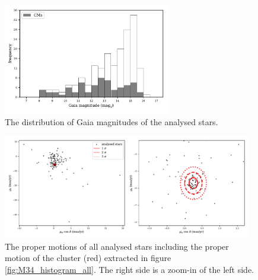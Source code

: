 \documentclass{article}
\begin{document}
\begin{figure}[H]
  \centering
    \includegraphics[trim={0 0.4cm 0 0.2cm},clip,width=0.65\textwidth]{M34_histogram_mags.pdf}
  \caption{The distribution of Gaia magnitudes of the analysed stars.}
  \label{fig:M34_histogram_mags}
\end{figure}

\begin{figure}[H]
  \centering
    \includegraphics[trim={0 0.5cm 0 0.5cm},clip,width=0.97\textwidth]{M34_pm_scatter_sigma.pdf}
  \caption{The proper motions of all analysed stars including the proper motion of the cluster (red) extracted in figure \ref{fig:M34_histogram_all}. The right side is a zoom-in of the left side.}
  \label{fig:M34_pm_scatter_sigma}
\end{figure}
\end{document}
